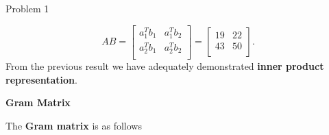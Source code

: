 \begin{problem}{Problem 1}
\begin{highlight}[Solution]
        \begin{equation*}
            AB = 
            \begin{bmatrix}
                a_{1}^{T}b_{1} & a_{1}^{T}b_{2} \\
                a_{2}^{T}b_{1} & a_{2}^{T}b_{2} \\
            \end{bmatrix}
            = 
            \begin{bmatrix}
                19 & 22 \\
                43 & 50 \\
            \end{bmatrix}.
        \end{equation*}
        From the previous result we have adequately demonstrated \textbf{inner product representation}. \vspace*{1em}

        \noindent \textbf{Gram Matrix} \vspace*{1em}

        The \textbf{Gram matrix} is as follows


\end{highlight}
\end{problem}
